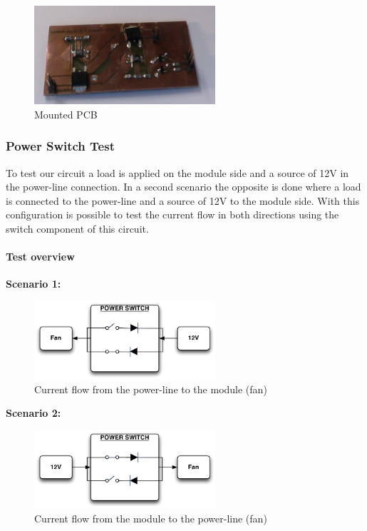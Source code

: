 \begin{figure}[H]
	\begin{centering}
		\includegraphics[width=0.6\textwidth,page=1]{content/appendix/eudp/images/mounted.png}
		\caption{Mounted PCB}
	\end{centering}
\end{figure}

\subsubsection{Power Switch Test}
To test our circuit a load is applied on the module side and a source of 12V in the power-line connection. In a second scenario the opposite is done where a load is connected to the power-line and a source of 12V to the module side.
With this configuration is possible to test the current flow in both directions using the switch component of this circuit.
\paragraph{Test overview}
\textbf{Scenario 1:}
\begin{figure}[H]
	\begin{centering}
		\includegraphics[width=0.6\textwidth,page=1]{content/appendix/eudp/images/scenario1.pdf}
		\caption{Current flow from the power-line to the module (fan)}
	\end{centering}
\end{figure}
\textbf{Scenario 2:}
\begin{figure}[H]
	\begin{centering}
		\includegraphics[width=0.6\textwidth,page=1]{content/appendix/eudp/images/scenario2.pdf}
		\caption{Current flow from the module to the power-line (fan)}
	\end{centering}
\end{figure}
